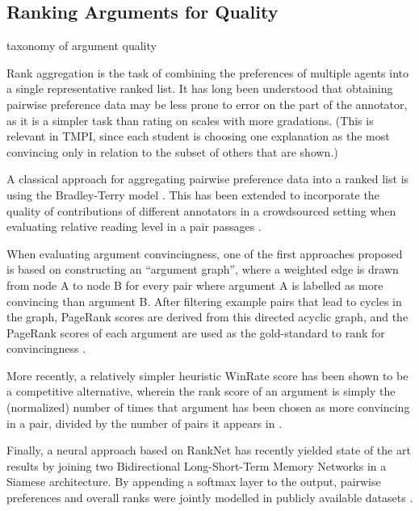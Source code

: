 \documentclass[notitlepage,12pt]{jedm}
\begin{document}
\subsection{Ranking Arguments for Quality}

taxonomy of argument quality \cite{wachsmuth_computational_2017}
\cite{persing_modeling_2015}

\cite{nguyen_argument_2018}


Rank aggregation is the task of combining the preferences of multiple agents 
into a single representative ranked list.
It has long been understood that obtaining pairwise preference data may be 
less prone to error on the part of the annotator, as it is a simpler task than 
rating on scales with more gradations. 
(This is relevant in TMPI, since each student is choosing one explanation as 
the most convincing only in relation to the subset of others that are shown.)

A classical approach for aggregating pairwise preference data into a ranked 
list is using the Bradley-Terry model \cite{bradley_rank_1952}. 
This has been extended to incorporate the quality of contributions of different 
annotators in a crowdsourced setting when evaluating relative reading level in 
a pair passages \cite{chen_pairwise_2013}. 

When evaluating argument convincingness, one of the first approaches proposed 
is based on constructing an ``argument graph'', where a weighted edge is drawn 
from node A to node B for every pair where argument A is labelled as more 
convincing than argument B. 
After filtering example pairs that lead to cycles in the graph, PageRank scores 
are derived from this directed acyclic graph, and the PageRank 
scores of each argument are used as the gold-standard to rank for 
convincingness \cite{habernal_which_2016}.

More recently, a relatively simpler heuristic WinRate score has been shown to 
be a competitive alternative, wherein the rank score of an argument is simply 
the (normalized) number of times that argument has been chosen as more 
convincing in a pair, divided by the number of pairs it appears in 
\cite{potash_ranking_2019}.

Finally, a neural approach based on RankNet has recently yielded state of the 
art results by joining two Bidirectional Long-Short-Term Memory Networks in a 
Siamese architecture. By appending a softmax layer to the output, pairwise 
preferences and overall ranks were jointly modelled in publicly available 
datasets \cite{gleize_are_2019}.
\end{document}
